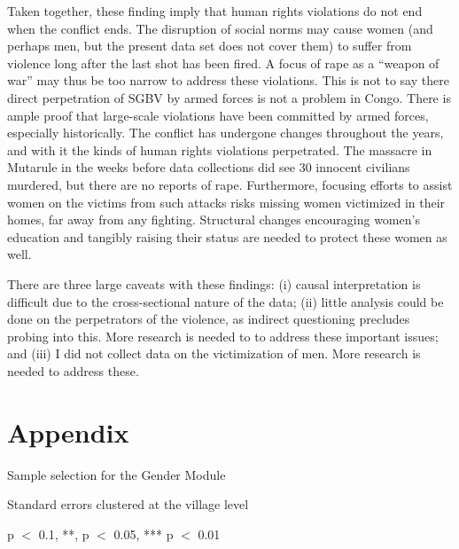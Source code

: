 Taken together, these finding imply that human rights violations do not end when the conflict ends. The disruption of social norms may cause women (and perhaps men, but the present data set does not cover them) to suffer from violence long after the last shot has been fired. A focus of rape as a ``weapon of war'' may thus be too narrow to address these violations. This is not to say there direct perpetration of SGBV by armed forces is not a problem in Congo. There is ample proof that large-scale violations have been committed by armed forces, especially historically. The conflict has undergone changes throughout the years, and with it the kinds of human rights violations perpetrated. The massacre in Mutarule in the weeks before data collections did see 30 innocent civilians murdered, but there are no reports of rape. Furthermore, focusing efforts to assist women on the victims from such attacks risks missing women victimized in their homes, far away from any fighting. Structural changes encouraging women's education and tangibly raising their status are needed to protect these women as well. 

There are three large caveats with these findings: (i) causal interpretation is difficult due to the cross-sectional nature of the data; (ii) little analysis could be done on the perpetrators of the violence, as indirect questioning precludes probing into this. More research is needed to  to address these important issues; and (iii) I did not  collect data on the victimization of men. More research is needed to address these.

\clearpage
\section{Appendix}
\setcounter{table}{0}
\renewcommand{\thetable}{\arabic{chapter}.A\arabic{table}}

\begin{table}[hp]
\centering
\begin{threeparttable}
	\singlespacing
	\small
	\caption{Sample selection for the Gender Module}\label{tab:sample_selection}
	\begin{center}
	
	\begin{tablenotes}
	 \footnotesize
	 \item Standard errors clustered at the village level
	 \item * p $<$ 0.1, **, p $<$ 0.05, *** p $<$ 0.01
	\end{tablenotes}
	\end{center}
\end{threeparttable}
\end{table}


